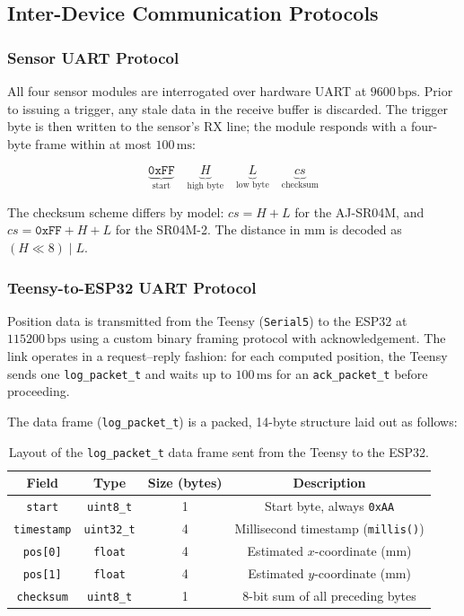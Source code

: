 \subsection{Inter-Device Communication Protocols}
\label{subsec:uart-protocol}

\subsubsection{Sensor UART Protocol}

All four sensor modules are interrogated over hardware UART at $9600\,\text{bps}$. Prior to issuing a trigger, any stale data in the receive buffer is discarded. The trigger byte is then written to the sensor's RX line; the module responds with a four-byte frame within at most $100\,\text{ms}$:

\[
\underbrace{\texttt{0xFF}}_{\text{start}} \quad
\underbrace{H}_{\text{high byte}} \quad
\underbrace{L}_{\text{low byte}} \quad
\underbrace{\mathit{cs}}_{\text{checksum}}
\]

The checksum scheme differs by model: $\mathit{cs} = H + L$ for the AJ-SR04M, and $\mathit{cs} = \texttt{0xFF} + H + L$ for the SR04M-2. The distance in mm is decoded as $(H \ll 8) \mid L$.

\subsubsection{Teensy-to-ESP32 UART Protocol}

Position data is transmitted from the Teensy (\texttt{Serial5}) to the ESP32 at $115200\,\text{bps}$ using a custom binary framing protocol with acknowledgement. The link operates in a request--reply fashion: for each computed position, the Teensy sends one \texttt{log\_packet\_t} and waits up to $100\,\text{ms}$ for an \texttt{ack\_packet\_t} before proceeding.

The data frame (\texttt{log\_packet\_t}) is a packed, 14-byte structure laid out as follows:

\begin{table}[ht]
    \centering
    \caption{Layout of the \texttt{log\_packet\_t} data frame sent from the Teensy to the ESP32.}
    \label{tab:log-packet}
    \begin{tabular}{cccc}
        \toprule
        Field & Type & Size (bytes) & Description \\
        \midrule
        \texttt{start}     & \texttt{uint8\_t}  & 1 & Start byte, always \texttt{0xAA} \\
        \texttt{timestamp} & \texttt{uint32\_t} & 4 & Millisecond timestamp (\texttt{millis()}) \\
        \texttt{pos[0]}    & \texttt{float}     & 4 & Estimated $x$-coordinate (mm) \\
        \texttt{pos[1]}    & \texttt{float}     & 4 & Estimated $y$-coordinate (mm) \\
        \texttt{checksum}  & \texttt{uint8\_t}  & 1 & 8-bit sum of all preceding bytes \\
        \bottomrule
    \end{tabular}
\end{table}

